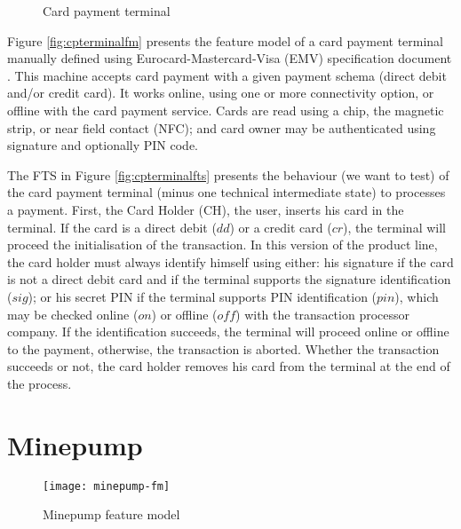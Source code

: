 \label{sec:casestudy:cpterminal}

\begin{figure}
	\centering
	\caption{Card payment terminal}
\end{figure}

Figure \ref{fig:cpterminalfm} presents the \gls{feature model} of a card payment terminal manually defined using Eurocard-Mastercard-Visa (EMV) specification document \cite{EMVCo2011}. This machine accepts card payment with a given payment schema (direct debit and/or credit card). It works online, using one or more connectivity option, or offline with the card payment service. Cards are read using a chip, the magnetic strip, or near field contact (NFC); and card owner may be authenticated using signature and optionally PIN code.

The FTS in Figure \ref{fig:cpterminalfts} presents the behaviour (we want to test) of the card payment terminal (minus one technical intermediate state) to processes a payment. First, the Card Holder (CH), \ie the user, inserts his card in the terminal. If the card is a direct debit ($dd$) or a credit card ($cr$), the terminal will proceed the initialisation of the transaction. In this version of the product line, the card holder must always identify himself using either: his signature if the card is not a direct debit card and if the terminal supports the signature identification ($sig$); or his secret \gls{PIN} if the terminal supports PIN identification ($pin$), which may be checked online ($on$) or offline ($off$) with the transaction processor company. If the identification succeeds, the terminal will proceed online or offline to the payment, otherwise, the transaction is aborted. Whether the transaction succeeds or not, the card holder removes his card from the terminal at the end of the process.


\section{Minepump}

\label{sec:casestudy:minepump}

\begin{figure}
	\centering
	\texttt{[image: minepump-fm]}
	\caption{Minepump feature model}
	\label{fig:minepumpfm}
\end{figure}

